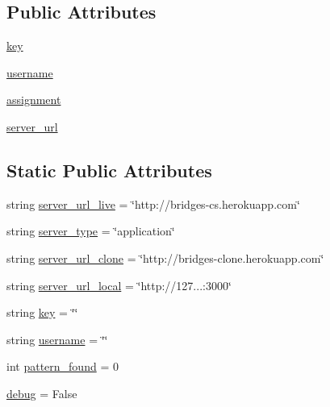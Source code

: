 \subsection*{Public Attributes}
\begin{DoxyCompactItemize}
\item 
\hyperlink{class_bridges_1_1connector_1_1_connector_aec2420c13d254608819cae41f3f195cd}{key}
\item 
\hyperlink{class_bridges_1_1connector_1_1_connector_ab87dbc1ca549f3c2b4ac5a19abcc20e0}{username}
\item 
\hyperlink{class_bridges_1_1connector_1_1_connector_a1f6453ca6554da7ea99be8e55b51b4bf}{assignment}
\item 
\hyperlink{class_bridges_1_1connector_1_1_connector_a8795d2c7dca04e053f89ded81fe1a119}{server\+\_\+url}
\end{DoxyCompactItemize}
\subsection*{Static Public Attributes}
\begin{DoxyCompactItemize}
\item 
string \hyperlink{class_bridges_1_1connector_1_1_connector_a09a97560dfa55c54150995cabac1e3d6}{server\+\_\+url\+\_\+live} = \char`\"{}http\+://bridges-\/cs.\+herokuapp.\+com\char`\"{}
\item 
string \hyperlink{class_bridges_1_1connector_1_1_connector_a6c173137459a0459e44d3c60b9ed87fb}{server\+\_\+type} = \char`\"{}application\char`\"{}
\item 
string \hyperlink{class_bridges_1_1connector_1_1_connector_a0759bc6496c03d8faafdd0612537e7d3}{server\+\_\+url\+\_\+clone} = \char`\"{}http\+://bridges-\/clone.\+herokuapp.\+com\char`\"{}
\item 
string \hyperlink{class_bridges_1_1connector_1_1_connector_a546bccb78927ff9573cee8caa41b210e}{server\+\_\+url\+\_\+local} = \char`\"{}http\+://127...\+:3000\char`\"{}
\item 
string \hyperlink{class_bridges_1_1connector_1_1_connector_abea85b824f7ab9c52c70c9d6bcf4fa74}{key} = \char`\"{}\char`\"{}
\item 
string \hyperlink{class_bridges_1_1connector_1_1_connector_aeab093f0dd4b59e46ab280bf7af5ffb8}{username} = \char`\"{}\char`\"{}
\item 
int \hyperlink{class_bridges_1_1connector_1_1_connector_a671d65c7d835316c0b2b17d910bbd1c0}{pattern\+\_\+found} = 0
\item 
\hyperlink{class_bridges_1_1connector_1_1_connector_a7636c120b9922e01529f4d36ded3d904}{debug} = False
\end{DoxyCompactItemize}


